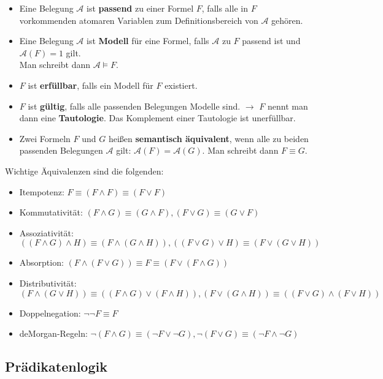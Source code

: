 \begin{itemize}
	\item Eine Belegung $\mathcal A$ ist \textbf{passend} zu einer  Formel $F$, falls alle in $F$ vorkommenden atomaren Variablen zum Definitionsbereich von $\mathcal A$ gehören.
	\item Eine Belegung $\mathcal A$ ist \textbf{Modell} für eine Formel, falls $\mathcal A$ zu $F$ passend ist und $\mathcal A(F)=1$ gilt.\\
			Man schreibt dann $\mathcal A \vDash F$.
	\item $F$ ist \textbf{erfüllbar}, falls ein Modell für $F$ existiert.
	\item $F$ ist \textbf{gültig}, falls alle passenden Belegungen Modelle sind. $\rightarrow$ $F$ nennt man dann eine  \textbf{Tautologie}. Das Komplement einer Tautologie ist unerfüllbar.
	\item Zwei Formeln $F$ und $G$ heißen \textbf{semantisch äquivalent}, wenn alle zu beiden passenden Belegungen $\mathcal A$ gilt: $\mathcal A(F) = \mathcal A(G)$. Man schreibt dann $F\equiv G$.
\end{itemize}

\vspace{1em}

Wichtige Äquivalenzen sind die folgenden:
\begin{itemize}
	\item Itempotenz: $F\equiv (F\wedge F)\equiv (F\vee F)$
	\item Kommutativität: $(F\wedge G)\equiv (G\wedge F), (F\vee G)\equiv (G\vee F)$
	\item Assoziativität: $((F\wedge G)\wedge H)\equiv(F\wedge (G\wedge H)), ((F\vee G)\vee H)\equiv(F\vee (G\vee H))$
	\item Absorption: $(F\wedge (F\vee G))\equiv F \equiv (F\vee (F\wedge G))$
	\item Distributivität: $(F\wedge (G\vee H))\equiv ((F\wedge G)\vee (F\wedge H)), (F\vee (G\wedge H))\equiv ((F\vee G)\wedge (F\vee H))$
	\item Doppelnegation: $\neg\neg F \equiv F$
	\item deMorgan-Regeln: $\neg (F\wedge G)\equiv (\neg F\vee \neg G), \neg (F\vee G)\equiv (\neg F\wedge \neg G)$
\end{itemize}


\subsection{Prädikatenlogik}



